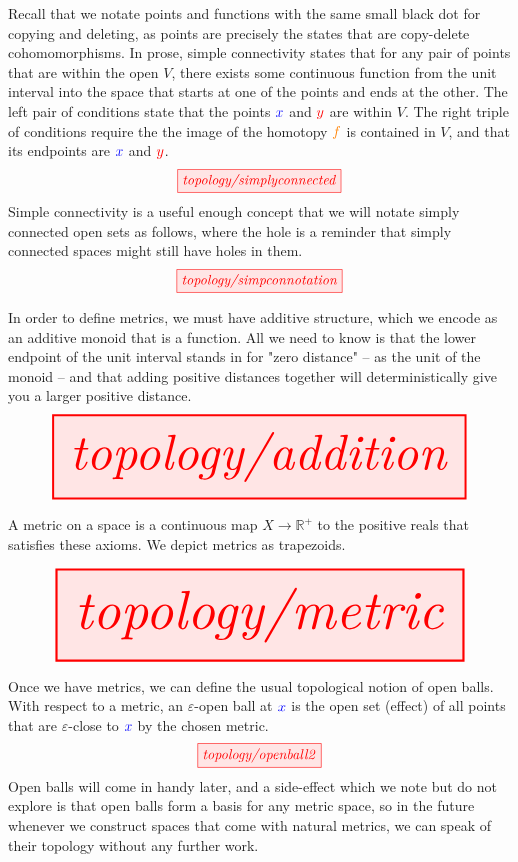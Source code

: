 \begin{myboxB}
\begin{defn}\label{def:simpconn}
Recall that we notate points and functions with the same small black dot for copying and deleting, as points are precisely the states that are copy-delete cohomomorphisms. In prose, simple connectivity states that for any pair of points that are within the open $V$, there exists some continuous function from the unit interval into the space that starts at one of the points and ends at the other. The left pair of conditions state that the points $\textcolor{blue}{x}$ and $\textcolor{red}{y}$ are within $V$. The right triple of conditions require the the image of the homotopy $\textcolor{orange}{f}$ is contained in $V$, and that its endpoints are $\textcolor{blue}{x}$ and $\textcolor{red}{y}$.
\[\tikzfig{topology/simplyconnected}\]
Simple connectivity is a useful enough concept that we will notate simply connected open sets as follows, where the hole is a reminder that simply connected spaces might still have holes in them.
\[\tikzfig{topology/simpconnotation}\]
\end{defn}
\end{myboxB}

\begin{myboxR}
\begin{defn}[Addition]\label{def:addition}
In order to define metrics, we must have additive structure, which we encode as an additive monoid that is a function. All we need to know is that the lower endpoint of the unit interval stands in for "zero distance" -- as the unit of the monoid -- and that adding positive distances together will deterministically give you a larger positive distance.
\[\resizebox{\textwidth}{!}{\tikzfig{topology/addition}}\]
\end{defn}
\end{myboxR}

\begin{myboxB}
\begin{defn}[Metric]\label{def:metric}
A metric on a space is a continuous map $X \rightarrow \mathbb{R}^+$ to the positive reals that satisfies these axioms. We depict metrics as trapezoids.
\end{defn}
\[\resizebox{\textwidth}{!}{\tikzfig{topology/metric}}\]
\end{myboxB}

\begin{myboxR}
\begin{defn}\label{def:openball}
Once we have metrics, we can define the usual topological notion of open balls. With respect to a metric, an $\varepsilon$-open ball at $\textcolor{blue}{x}$ is the open set (effect) of all points that are $\varepsilon$-close to $\textcolor{blue}{x}$ by the chosen metric.
\[\tikzfig{topology/openball2}\]
Open balls will come in handy later, and a side-effect which we note but do not explore is that open balls form a basis for any metric space, so in the future whenever we construct spaces that come with natural metrics, we can speak of their topology without any further work.
\end{defn}
\end{myboxR}

